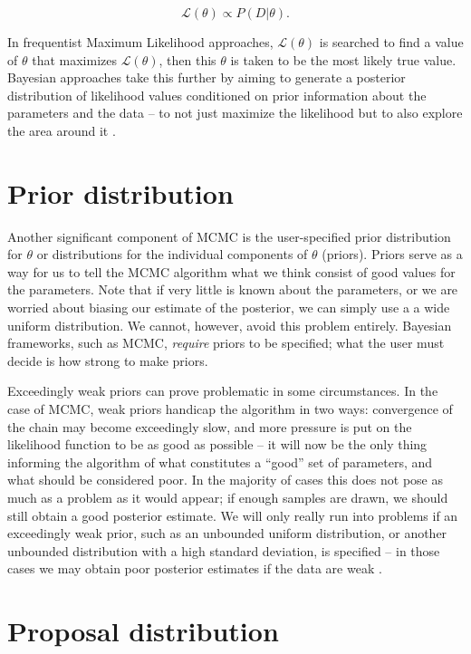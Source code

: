     \begin{equation}
    	\mathcal{L}(\theta) \propto P(D|\theta).
    \end{equation}

    In frequentist Maximum Likelihood approaches, $\mathcal{L}(\theta)$ is searched to find a value of $\theta$ that maximizes $\mathcal{L}(\theta)$, then this $\theta$ is taken to be the most likely true value. Bayesian approaches take this further by aiming to generate a posterior distribution of likelihood values conditioned on prior information about the parameters and the data -- to not just maximize the likelihood but to also explore the area around it \cite{Andrieu2003}.


\section{Prior distribution}

    Another significant component of MCMC is the user-specified prior distribution for $\theta$ or distributions for the individual components of $\theta$ (priors). Priors serve as a way for us to tell the MCMC algorithm what we think consist of good values for the parameters. Note that if very little is known about the parameters, or we are worried about biasing our estimate of the posterior, we can simply use a a wide uniform distribution. We cannot, however, avoid this problem entirely. Bayesian frameworks, such as MCMC, \textit{require} priors to be specified; what the user must decide is how strong to make priors.

   	Exceedingly weak priors can prove problematic in some circumstances. In the case of MCMC, weak priors handicap the algorithm in two ways: convergence of the chain may become exceedingly slow, and more pressure is put on the likelihood function to be as good as possible -- it will now be the only thing informing the algorithm of what constitutes a ``good'' set of parameters, and what should be considered poor. In the majority of cases this does not pose as much as a problem as it would appear; if enough samples are drawn, we should still obtain a good posterior estimate. We will only really run into problems if an exceedingly weak prior, such as an unbounded uniform distribution, or another unbounded distribution with a high standard deviation, is specified -- in those cases we may obtain poor posterior estimates if the data are weak \cite{Andrieu2003}.

\section{Proposal distribution}

